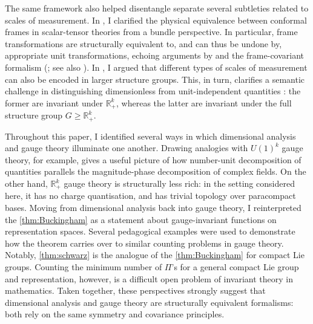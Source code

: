 \documentclass[12pt]{article}
\numberwithin{equation}{section}
\newcommand{\R}{\mathbb{R}}
\begin{document}
The same framework also helped disentangle separate several subtleties related to scales of measurement. In , I clarified the physical equivalence between conformal frames in scalar-tensor theories from a bundle perspective. In particular, frame transformations are structurally equivalent to, and can thus be undone by, appropriate unit transformations, echoing arguments by \citet{Dicke1962} and the frame-covariant formalism (\citealp{Flanagan2004, KuuskJarvVilson2016, Karamitsos2018}; see also \citealp{KaramitsosMuntz2025}). In , I argued that different types of scales of measurement can also be encoded in larger structure groups. This, in turn, clarifies a semantic challenge in distinguishing dimensionless from unit-independent quantities \citep{Emerson2005, Hall2022}: the former are invariant under $\R_+^k$, whereas the latter are invariant under the full structure group $G\geq \R_+^k$.

Throughout this paper, I identified several ways in which dimensional analysis and gauge theory illuminate one another. Drawing analogies with $U(1)^k$ gauge theory, for example, gives a useful picture of how number-unit decomposition of quantities parallels the magnitude-phase decomposition of complex fields. On the other hand, $\R_+^k$ gauge theory is structurally less rich: in the setting considered here, it has no charge quantisation, and has trivial topology over paracompact bases. Moving from dimensional analysis back into gauge theory, I reinterpreted the \cref{thm:Buckingham} as a statement about gauge-invariant functions on representation spaces. Several pedagogical examples were used to demonstrate how the theorem carries over to similar counting problems in gauge theory. Notably, \cref{thm:schwarz} is the analogue of the \cref{thm:Buckingham} for compact Lie groups. Counting the minimum number of $\Pi$'s for a general compact Lie group and representation, however, is a difficult open problem of invariant theory in mathematics. Taken together, these perspectives strongly suggest that dimensional analysis and gauge theory are structurally equivalent formalisms: both rely on the same symmetry and covariance principles.
\end{document}
